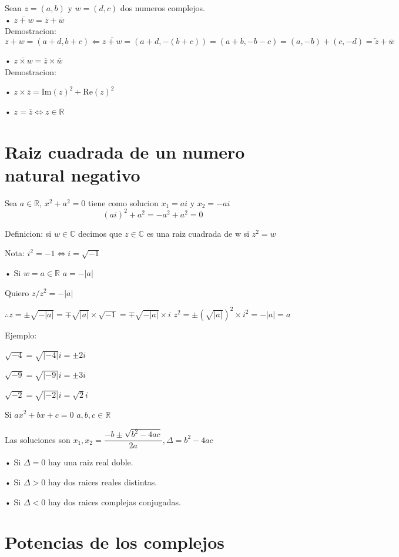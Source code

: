 Sean $z=(a,b)$ y $w=(d,c)$ dos numeros complejos.\\

• $\overline{z+w}= \overline{z}+\overline{w}$\\
Demostracion: 
$$z+w =(a+d,b+c) \Leftarrow \overline{z+w}=(a+d,-(b+c))=(a+b,-b-c)=(a,-b)+(c,-d)=\overleftarrow{z}+\overline{w}$$

• $\overline{z\times w}= \overline{z}\times \overline{w}$\\
Demostracion:
$$$$

• $z \times \overline{z} = $Im$(z)^2+$Re$(z)^2$

• $z=\overline{z} \Leftrightarrow z \in \mathbb{R}$

\section{Raiz cuadrada de un numero natural negativo}

Sea $a \in \mathbb{R}$, $x^2+a^2=0$ tiene como solucion $x_1=ai$ y $x_2=-ai$
$$(ai)^2+a^2=-a^2+a^2=0$$

Definicion: si $w \in \mathbb{C}$ decimos que $z \in \mathbb{C}$ es una raiz cuadrada de w si $z^2=w$

Nota: $i^2=-1 \Leftrightarrow i=\sqrt{-1}$

• Si $w=a \in \mathbb{R}$
\quad $a=-|a|$

Quiero $z / z^2=-|a|$

$\therefore z=\pm \sqrt{-|a|}=\mp \sqrt{|a|} \times \sqrt{-1}=\mp \sqrt{-|a|} \times i$
\qquad $z^2 = \pm \left( \sqrt{|a|} \right)^2 \times i^2= -|a| = a$

Ejemplo:

\qquad $\sqrt{-4}=\sqrt{|-4|}i=\pm 2i$

\qquad $\sqrt{-9}=\sqrt{|-9|}i=\pm 3i$

\qquad $\sqrt{-2}=\sqrt{|-2|}i=\sqrt{2}i$

Si $ax^2+bx+c=0$ \qquad $a,b,c \in \mathbb{R}$

\qquad \quad Las soluciones son $x_1,x_2 = \dfrac{-b\pm \sqrt{b^2-4ac}}{2a}, \Delta =b^2-4ac$


• Si $\Delta =0$ hay una raiz real doble.

• Si $\Delta >0$ hay dos raices reales distintas.

• Si $\Delta <0$ hay dos raices complejas conjugadas.

\section{Potencias de los complejos}

